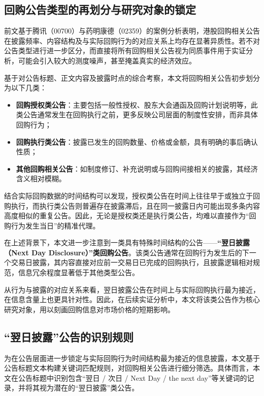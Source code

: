 \documentclass[a4paper,10pt]{article}
\begin{document}
\subsection{回购公告类型的再划分与研究对象的锁定}

前文基于腾讯（00700）与药明康德（02359）的案例分析表明，港股回购相关公告在披露频率、内容结构及与实际回购行为的对应关系上均存在显著异质性。若不对公告类型进行进一步区分，而直接将所有回购相关公告视为同质事件用于实证分析，可能会引入较大的测度噪声，甚至掩盖真实的经济效应。

基于对公告标题、正文内容及披露时点的综合考察，本文将回购相关公告初步划分为以下几类：

\begin{itemize}
    \item \textbf{回购授权类公告}：主要包括一般性授权、股东大会通函及回购计划说明等，此类公告通常发生在回购执行之前，更多反映公司层面的制度性安排，而非具体回购行为；
    \item \textbf{回购执行类公告}：披露已发生的回购数量、价格或金额，具有明确的事后确认性质；
    \item \textbf{其他回购相关公告}：如制度修订、补充说明或与回购间接相关的披露，其经济含义相对模糊。
\end{itemize}

结合实际回购数据的时间结构可以发现，授权类公告在时间上往往早于或独立于回购执行，而执行类公告则普遍存在披露滞后，且在同一披露日内可能出现多条内容高度相似的重复公告。因此，无论是授权类还是执行类公告，均难以直接作为“回购行为发生当日”的精准代理。

在上述背景下，本文进一步注意到一类具有特殊时间结构的公告——\textbf{“翌日披露（Next Day Disclosure）”类回购公告}。该类公告通常在回购行为发生后的下一个交易日披露，其内容直接对应前一交易日已完成的回购执行，且披露逻辑相对规范，信息冗余程度显著低于其他类型公告。

从行为与披露的对应关系来看，翌日披露公告在时间上与实际回购执行最为接近，在信息含量上也更具针对性。因此，在后续实证分析中，本文将该类公告作为核心研究对象，用以刻画回购信息对市场价格的短期影响。

\subsection{“翌日披露”公告的识别规则}

为在公告层面进一步锁定与实际回购行为时间结构最为接近的信息披露，本文基于公告标题文本构建关键词匹配规则，对回购相关公告进行细分筛选。具体而言，本文在公告标题中识别包含“翌日 / 次日 / Next Day / the next day”等关键词的记录，并将其视为潜在的“翌日披露”类公告。
\end{document}
